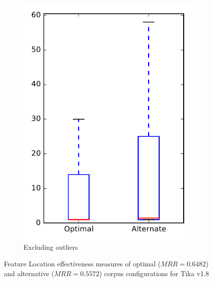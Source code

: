 \begin{figure}
\begin{subfigure}{.4\textwidth}
        \includegraphics[height=0.4\textheight]{figures/combo/flt_rq2_tika_no_outlier}
        \caption{Excluding outliers}\label{fig:combo:flt:rq2:tika_no_outlier}
    \end{subfigure}
\caption[Feature Location effectiveness measures of optimal and alternative corpus configurations for Tika v1.8]%
{Feature Location effectiveness measures of optimal ($MRR=0.6482$) and alternative ($MRR=0.5572$) corpus configurations for Tika v1.8}
\label{fig:combo:flt:rq2:tika}
\end{figure}

